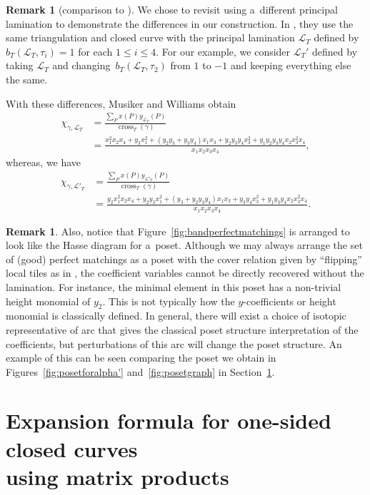 \documentclass[10pt,a4paper]{amsart}
\numberwithin{equation}{section}
\theoremstyle{definition}
\newtheorem{Remark}[Theorem]{Remark}
\begin{document}
\begin{Remark}[{comparison to \cite[Example~3.23]{MW13}}] We chose to revisit \cite[Example 3.23]{MW13} using a~different principal lamination to demonstrate the differences in our construction. In \cite{MW13}, they use the same triangulation and closed curve with the principal lamination $\mathcal{L}_T$ defined by~$b_T(\mathcal{L}_T, \tau_{i})=1$ for each $1\leq i\leq 4$. For our example, we consider $\mathcal{L}_T'$ defined by taking $\mathcal{L}_T$ and changing~$b_T(\mathcal{L}_T, \tau_2)$ from $1$ to $-1$ and keeping everything else the same.

With these differences, Musiker and Williams obtain
\begin{align*}
\chi_{\gamma, \mathcal{L}_T}&=\frac{\sum_P x(P)y_{\mathcal{L}_T}(P)}{\operatorname{cross}_T(\gamma)}\\
&=\frac{x_1^2x_2x_4+y_3x_1^2+(y_2y_3+y_3y_4)x_1x_3+y_2y_3y_4x_3^2+y_1y_2y_3y_4x_2x_3^2x_4}{x_1x_2x_3x_4},\end{align*}
whereas, we have
\begin{align*}
\chi_{\gamma, \mathcal{L'}_T}&=\frac{\sum_P x(P)y_{\mathcal{L'}_T}(P)}{\operatorname{cross}_T(\gamma)}\\
&=\frac{y_2x_1^2x_2x_4+y_2y_3x_1^2+(y_3+y_2y_3y_4)x_1x_3+y_3y_4x_3^2+y_1y_3y_4x_2x_3^2x_4}{x_1x_2x_3x_4}.\end{align*}
\end{Remark}

\begin{Remark}
Also, notice that Figure~\ref{fig:bandperfectmatchings} is arranged to look like the Hasse diagram for a~poset. Although we may always arrange the set of (good) perfect matchings as a poset with the cover relation given by ``flipping'' local tiles as in \cite{MSW11}, the coefficient variables cannot be directly recovered without the lamination. For instance, the minimal element in this poset has a non-trivial height monomial of $y_2$. This is not typically how the $y$-coefficients or height monomial is classically defined. In general, there will exist a choice of isotopic representative of arc that gives the classical poset structure interpretation of the coefficients, but perturbations of this arc will change the poset structure. An example of this can be seen comparing the poset we obtain in Figures~\ref{fig:posetforalpha'} and~\ref{fig:posetgraph} in Section~\ref{section:expansionformulanonorientable}.
\end{Remark}


\section[Expansion formula for one-sided closed curves using matrix products]{Expansion formula for one-sided closed curves\\ using matrix products}\label{section:expansionformulanonorientable}
\end{document}
